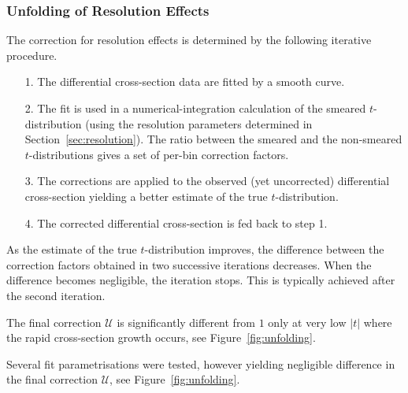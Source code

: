 
\subsubsection{Unfolding of Resolution Effects}
\label{sec:unfolding}

The correction for resolution effects is determined by the following iterative procedure.
\begin{itemize}
\item[1.] The differential cross-section data are fitted by a smooth curve.
\item[2.] The fit is used in a numerical-integration calculation of the smeared $t$-distribution (using the resolution parameters determined in Section~\ref{sec:resolution}). The ratio between the smeared and the non-smeared $t$-distributions gives a set of per-bin correction factors.
\item[3.] The corrections are applied to the observed (yet uncorrected) differential cross-section yielding a better estimate of the true $t$-distribution.
\item[4.] The corrected differential cross-section is fed back to step 1.
\end{itemize}
As the estimate of the true $t$-distribution improves, the difference between the correction factors obtained in two successive iterations decreases. When the difference becomes negligible, the iteration stops. This is typically achieved after the second iteration. 

The final correction $\mathcal{U}$ is significantly different from $1$ only at very low $|t|$ where the rapid cross-section growth occurs, see Figure~\ref{fig:unfolding}.

Several fit parametrisations were tested, however yielding negligible difference in the final correction $\mathcal{U}$, see Figure~\ref{fig:unfolding}.

